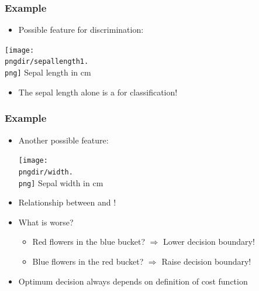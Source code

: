 \begin{frame}
   \frametitle{Example \cont}


   \begin{itemize}
      \item Possible feature for discrimination: 
   \end{itemize}
   \begin{center}
      \texttt{[image: \\pngdir/sepallength1.\\png]}\newline%
      \scriptsize{Sepal length in cm}\hspace{1.5cm}$\quad$
   \end{center}
   \begin{itemize}
      \item The sepal length alone is a  for classification!
   \end{itemize}
\end{frame}


\begin{frame}
   \frametitle{Example \cont}

   \begin{itemize}
      \setlength\itemsep{0.1cm}
      \item Another possible feature: 

        \begin{center}
           \texttt{[image: \\pngdir/width.\\png]}\newline%
           \scriptsize{Sepal width in cm}\hspace{1.5cm}$\quad$
        \end{center}

      \item Relationship between  and !
      \item  What is worse?
        \begin{itemize}
           \item Red flowers in the blue bucket? $\Rightarrow$ Lower decision boundary!
           \item Blue flowers in the red bucket? $\Rightarrow$ Raise decision boundary!
        \end{itemize}
      \item Optimum decision always depends on definition of cost function
   \end{itemize}
\end{frame}


